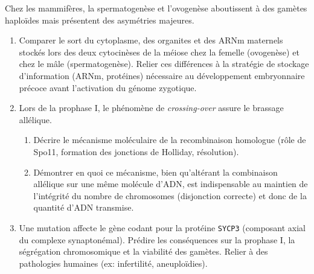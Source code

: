 \documentclass[11pt]{article}
\begin{document}
\begin{exercice}
Chez les mammifères, la spermatogenèse et l'ovogenèse aboutissent à des gamètes haploïdes mais présentent des asymétries majeures.
\begin{enumerate}
    \item Comparer le sort du cytoplasme, des organites et des ARNm maternels stockés lors des deux cytocinèses de la méiose chez la femelle (ovogenèse) et chez le mâle (spermatogenèse). Relier ces différences à la stratégie de stockage d'information (ARNm, protéines) nécessaire au développement embryonnaire précoce avant l'activation du génome zygotique.
    \item Lors de la prophase I, le phénomène de \textit{crossing-over} assure le brassage allélique. 
    \begin{enumerate}
        \item Décrire le mécanisme moléculaire de la recombinaison homologue (rôle de Spo11, formation des jonctions de Holliday, résolution).
        \item Démontrer en quoi ce mécanisme, bien qu'altérant la combinaison allélique sur une même molécule d'ADN, est indispensable au maintien de l'intégrité du nombre de chromosomes (disjonction correcte) et donc de la quantité d'ADN transmise.
    \end{enumerate}
    \item Une mutation affecte le gène codant pour la protéine \texttt{SYCP3} (composant axial du complexe synaptonémal). Prédire les conséquences sur la prophase I, la ségrégation chromosomique et la viabilité des gamètes. Relier à des pathologies humaines (ex: infertilité, aneuploïdies).
\end{enumerate}
\end{exercice}
\end{document}
